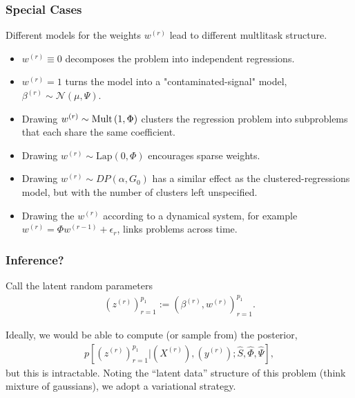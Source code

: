 \documentclass[10pt]{beamer}\usepackage[]{graphicx}\usepackage[]{color}
\newcommand{\eps}{\epsilon}
\def\Gsn{\mathcal{N}}
\def\Mult{\textnormal{Mult}}
\begin{document}
\begin{frame}
  \frametitle{Special Cases}
  Different models for the weights $w^{(r)}$ lead to different multlitask
  structure.
  \begin{itemize}
  \item $w^{(r)} \equiv 0$ decomposes the problem into independent regressions.
  \item $w^{(r)} = 1$ turns the model into a "contaminated-signal"
    model, $\beta^{(r)} \sim \Gsn\left(\mu, \Psi\right)$.
  \item Drawing $w^{(r)} \sim \Mult\left(1, \Phi\right)$ clusters the regression
    problem into subproblems that each share the same coefficient.
  \item Drawing $w^{(r)} \sim \text{Lap}\left(0, \Phi\right)$
    encourages sparse weights.
  \item Drawing $w^{(r)} \sim DP\left(\alpha, G_{0}\right)$ has a similar effect
    as the clustered-regressions model, but with the number of clusters left
    unspecified.
  \item Drawing the $w^{(r)}$ according to a dynamical system, for example
    $w^{(r)} = \Phi w^{(r - 1)} + \eps_{r}$, links problems across time.
\end{itemize}
\end{frame}

\begin{frame}
  \frametitle{Inference?}
  Call the latent random parameters
  \begin{align}
    \left(z^{(r)}\right)_{r = 1}^{p_{1}} := \left(\beta^{(r)}, w^{(r)}\right)_{r = 1}^{p_{1}}.
  \end{align}

  Ideally, we would be able to compute (or sample from) the posterior,
  \begin{align}
    p\left[\left(z^{(r)}\right)_{r = 1}^{p_{1}} \vert \left(X^{(r)}\right), \left(y^{(r)}\right); \hat{S}, \hat{\Phi}, \hat{\Psi}\right], 
  \end{align}
  but this is intractable. Noting the ``latent data'' structure of this problem
  (think mixture of gaussians), we adopt a variational strategy.
\end{frame}
\end{document}
